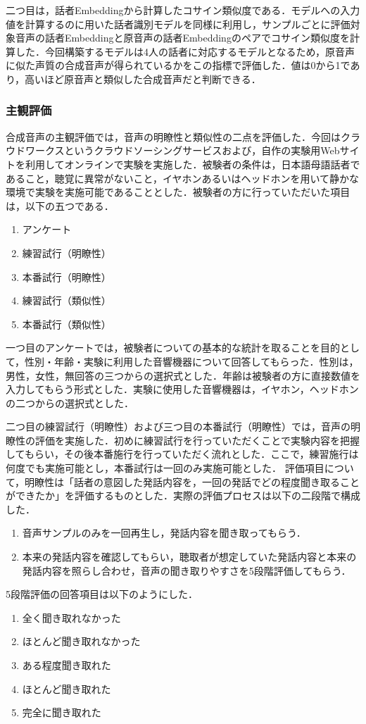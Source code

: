 \documentclass[12pt]{jarticle}
\numberwithin{equation}{section}    %
\numberwithin{figure}{section}      %
\numberwithin{table}{section}      %
\begin{document}
二つ目は，話者Embeddingから計算したコサイン類似度である．モデルへの入力値を計算するのに用いた話者識別モデルを同様に利用し，サンプルごとに評価対象音声の話者Embeddingと原音声の話者Embeddingのペアでコサイン類似度を計算した．今回構築するモデルは4人の話者に対応するモデルとなるため，原音声に似た声質の合成音声が得られているかをこの指標で評価した．値は0から1であり，高いほど原音声と類似した合成音声だと判断できる．

\subsubsection{主観評価}
\label{sec4:sec:sbj_explanation}
合成音声の主観評価では，音声の明瞭性と類似性の二点を評価した．今回はクラウドワークスというクラウドソーシングサービスおよび，自作の実験用Webサイトを利用してオンラインで実験を実施した．被験者の条件は，日本語母語話者であること，聴覚に異常がないこと，イヤホンあるいはヘッドホンを用いて静かな環境で実験を実施可能であることとした．被験者の方に行っていただいた項目は，以下の五つである．
\begin{enumerate}
    \item アンケート
    \item 練習試行（明瞭性）
    \item 本番試行（明瞭性）
    \item 練習試行（類似性）
    \item 本番試行（類似性）
\end{enumerate}

一つ目のアンケートでは，被験者についての基本的な統計を取ることを目的として，性別・年齢・実験に利用した音響機器について回答してもらった．性別は，男性，女性，無回答の三つからの選択式とした．年齢は被験者の方に直接数値を入力してもらう形式とした．実験に使用した音響機器は，イヤホン，ヘッドホンの二つからの選択式とした．

二つ目の練習試行（明瞭性）および三つ目の本番試行（明瞭性）では，音声の明瞭性の評価を実施した．初めに練習試行を行っていただくことで実験内容を把握してもらい，その後本番施行を行っていただく流れとした．ここで，練習施行は何度でも実施可能とし，本番試行は一回のみ実施可能とした．
評価項目について，明瞭性は「話者の意図した発話内容を，一回の発話でどの程度聞き取ることができたか」を評価するものとした．実際の評価プロセスは以下の二段階で構成した．
\begin{enumerate}
    \item 音声サンプルのみを一回再生し，発話内容を聞き取ってもらう．
    \item 本来の発話内容を確認してもらい，聴取者が想定していた発話内容と本来の発話内容を照らし合わせ，音声の聞き取りやすさを5段階評価してもらう．
\end{enumerate}
5段階評価の回答項目は以下のようにした．
\begin{enumerate}
    \item 全く聞き取れなかった
    \item ほとんど聞き取れなかった
    \item ある程度聞き取れた
    \item ほとんど聞き取れた
    \item 完全に聞き取れた
\end{enumerate}
\end{document}
